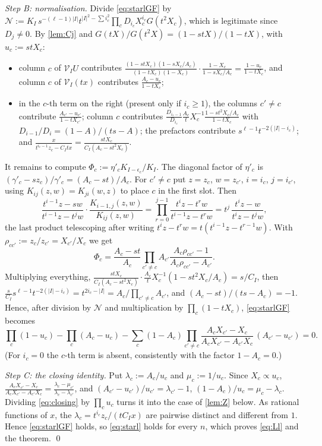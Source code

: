 \documentclass[11pt]{amsart}
\theoremstyle{definition}
\theoremstyle{remark}
\numberwithin{equation}{section}
\begin{document}
\emph{Step B: normalisation.} Divide \eqref{eq:starlGF} by $\mathcal N:=K_I\,s^{-(\ell-1)|I|}t^{|I|^2-\sum i_c^2}\prod_cD_{i_c}X_c^{i_c}G(t^2X_c)$, which is legitimate since $D_j\ne0$. By \cref{lem:Cj} and $G(tX)/G(t^2X)=(1-stX)/(1-tX)$, with $u_c:=stX_c$:
\begin{itemize}
\item column $c$ of $\mathcal V_IU$ contributes $\frac{(1-stX_c)(1-sX_c/A_c)}{(1-tX_c)(1-X_c)}\cdot\frac{1-X_c}{1-sX_c/A_c}=\frac{1-u_c}{1-tX_c}$, and column $c$ of $\mathcal V_I(tx)$ contributes $\frac{A_c-u_c}{1-tX_c}$;
\item in the $c$-th term on the right (present only if $i_c\ge1$), the columns $c'\ne c$ contribute $\frac{A_{c'}-u_{c'}}{1-tX_{c'}}$; column $c$ contributes $\frac{D_{i_c-1}}{D_{i_c}}\frac{A_c}{t}X_c^{-1}\frac{1-st^2X_c/A_c}{1-tX_c}$ with $D_{i-1}/D_i=(1-A)/(ts-A)$; the prefactors contribute $s^{\ell-1}t^{-2(|I|-i_c)}$; and $\frac{x}{t^{i_c-1}z_c-C_Itx}=\frac{stX_c}{C_I(A_c-st^2X_c)}$.
\end{itemize}
It remains to compute $\Phi_c:=\eta'_cK_{I-\epsilon_c}/K_I$. The diagonal factor of $\eta'_c$ is $(\gamma'_c-sz_c)/\gamma'_c=(A_c-st)/A_c$. For $c'\neq c$ put $z=z_c$, $w=z_{c'}$, $i=i_c$, $j=i_{c'}$, using $K_{ij}(z,w)=K_{ji}(w,z)$ to place $c$ in the first slot. Then
\[ \frac{t^{i-1}z-sw}{t^{i-1}z-t^jw}\cdot\frac{K_{i-1,j}(z,w)}{K_{ij}(z,w)}=\prod_{r=0}^{j-1}\frac{t^iz-t^rw}{t^{i-1}z-t^rw}=t^j\,\frac{t^iz-w}{t^iz-t^jw}, \]
the last product telescoping after writing $t^iz-t^rw=t(t^{i-1}z-t^{r-1}w)$. With $\rho_{cc'}:=z_c/z_{c'}=X_{c'}/X_c$ we get
\[ \Phi_c=\frac{A_c-st}{A_c}\prod_{c'\neq c}A_{c'}\frac{A_c\rho_{cc'}-1}{A_c\rho_{cc'}-A_{c'}} . \]
Multiplying everything, $\frac{stX_c}{C_I(A_c-st^2X_c)}\cdot\frac{A_c}{t}X_c^{-1}(1-st^2X_c/A_c)=s/C_I$, then $\frac{s}{C_I}s^{\ell-1}t^{-2(|I|-i_c)}=t^{2i_c-|I|}=A_c/\prod_{c'\ne c}A_{c'}$, and $(A_c-st)/(ts-A_c)=-1$. Hence, after division by $\mathcal N$ and multiplication by $\prod_c(1-tX_c)$, \eqref{eq:starlGF} becomes
\begin{equation}\label{eq:closing}
\prod_c(1-u_c)-\prod_c(A_c-u_c)-\sum_c(1-A_c)\prod_{c'\ne c}\frac{A_cX_{c'}-X_c}{A_cX_{c'}-A_{c'}X_c}\,(A_{c'}-u_{c'})=0 .
\end{equation}
(For $i_c=0$ the $c$-th term is absent, consistently with the factor $1-A_c=0$.)

\emph{Step C: the closing identity.} Put $\lambda_c:=A_c/u_c$ and $\mu_c:=1/u_c$. Since $X_c\propto u_c$, $\frac{A_cX_{c'}-X_c}{A_cX_{c'}-A_{c'}X_c}=\frac{\lambda_c-\mu_{c'}}{\lambda_c-\lambda_{c'}}$, and $(A_{c'}-u_{c'})/u_{c'}=\lambda_{c'}-1$, $(1-A_c)/u_c=\mu_c-\lambda_c$. Dividing \eqref{eq:closing} by $\prod_cu_c$ turns it into the case of \cref{lem:Z} below. As rational functions of $x$, the $\lambda_c=t^{i_c}z_c/(tC_Ix)$ are pairwise distinct and different from $1$. Hence \eqref{eq:starlGF} holds, so \eqref{eq:starl} holds for every $n$, which proves \eqref{eq:Ll} and the theorem. \qed
\end{document}
